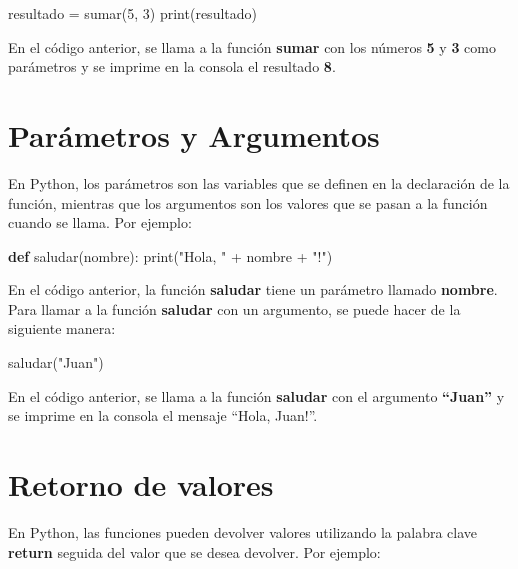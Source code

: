\documentclass[
  a4paper,
  DIV=11,
  numbers=noendperiod,
  onepage,
  openany]{scrreprt}
\newenvironment{Shaded}{\begin{snugshade}}{\end{snugshade}}
\newcommand{\BuiltInTok}[1]{\textcolor[rgb]{0.00,0.23,0.31}{#1}}
\newcommand{\DecValTok}[1]{\textcolor[rgb]{0.68,0.00,0.00}{#1}}
\newcommand{\KeywordTok}[1]{\textcolor[rgb]{0.00,0.23,0.31}{\textbf{#1}}}
\newcommand{\NormalTok}[1]{\textcolor[rgb]{0.00,0.23,0.31}{#1}}
\newcommand{\OperatorTok}[1]{\textcolor[rgb]{0.37,0.37,0.37}{#1}}
\newcommand{\StringTok}[1]{\textcolor[rgb]{0.13,0.47,0.30}{#1}}
\begin{document}
\begin{Shaded}
\begin{Highlighting}[]
\NormalTok{resultado }\OperatorTok{=}\NormalTok{ sumar(}\DecValTok{5}\NormalTok{, }\DecValTok{3}\NormalTok{)}
\BuiltInTok{print}\NormalTok{(resultado)}
\end{Highlighting}
\end{Shaded}

En el código anterior, se llama a la función \textbf{sumar} con los
números \textbf{5} y \textbf{3} como parámetros y se imprime en la
consola el resultado \textbf{8}.

\section{Parámetros y Argumentos}\label{paruxe1metros-y-argumentos}

En Python, los parámetros son las variables que se definen en la
declaración de la función, mientras que los argumentos son los valores
que se pasan a la función cuando se llama. Por ejemplo:

\begin{Shaded}
\begin{Highlighting}[]
\KeywordTok{def}\NormalTok{ saludar(nombre):}
    \BuiltInTok{print}\NormalTok{(}\StringTok{"Hola, "} \OperatorTok{+}\NormalTok{ nombre }\OperatorTok{+} \StringTok{"!"}\NormalTok{)}
\end{Highlighting}
\end{Shaded}

En el código anterior, la función \textbf{saludar} tiene un parámetro
llamado \textbf{nombre}. Para llamar a la función \textbf{saludar} con
un argumento, se puede hacer de la siguiente manera:

\begin{Shaded}
\begin{Highlighting}[]
\NormalTok{saludar(}\StringTok{"Juan"}\NormalTok{)}
\end{Highlighting}
\end{Shaded}

En el código anterior, se llama a la función \textbf{saludar} con el
argumento \textbf{``Juan''} y se imprime en la consola el mensaje
``Hola, Juan!''.

\section{Retorno de valores}\label{retorno-de-valores}

En Python, las funciones pueden devolver valores utilizando la palabra
clave \textbf{return} seguida del valor que se desea devolver. Por
ejemplo:
\end{document}
